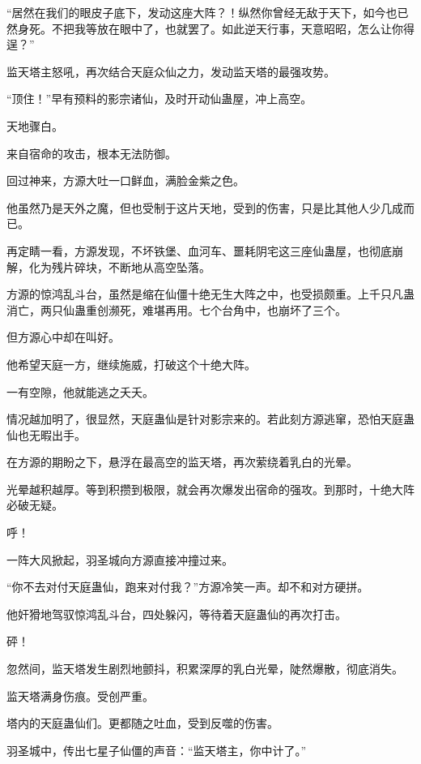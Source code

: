 
\begin{this_body}

“居然在我们的眼皮子底下，发动这座大阵？！纵然你曾经无敌于天下，如今也已然身死。不把我等放在眼中了，也就罢了。如此逆天行事，天意昭昭，怎么让你得逞？”

监天塔主怒吼，再次结合天庭众仙之力，发动监天塔的最强攻势。

“顶住！”早有预料的影宗诸仙，及时开动仙蛊屋，冲上高空。

天地骤白。

来自宿命的攻击，根本无法防御。

回过神来，方源大吐一口鲜血，满脸金紫之色。

他虽然乃是天外之魔，但也受制于这片天地，受到的伤害，只是比其他人少几成而已。

再定睛一看，方源发现，不坏铁堡、血河车、噩耗阴宅这三座仙蛊屋，也彻底崩解，化为残片碎块，不断地从高空坠落。

方源的惊鸿乱斗台，虽然是缩在仙僵十绝无生大阵之中，也受损颇重。上千只凡蛊消亡，两只仙蛊重创濒死，难堪再用。七个台角中，也崩坏了三个。

但方源心中却在叫好。

他希望天庭一方，继续施威，打破这个十绝大阵。

一有空隙，他就能逃之夭夭。

情况越加明了，很显然，天庭蛊仙是针对影宗来的。若此刻方源逃窜，恐怕天庭蛊仙也无暇出手。

在方源的期盼之下，悬浮在最高空的监天塔，再次萦绕着乳白的光晕。

光晕越积越厚。等到积攒到极限，就会再次爆发出宿命的强攻。到那时，十绝大阵必破无疑。

呼！

一阵大风掀起，羽圣城向方源直接冲撞过来。

“你不去对付天庭蛊仙，跑来对付我？”方源冷笑一声。却不和对方硬拼。

他奸猾地驾驭惊鸿乱斗台，四处躲闪，等待着天庭蛊仙的再次打击。

砰！

忽然间，监天塔发生剧烈地颤抖，积累深厚的乳白光晕，陡然爆散，彻底消失。

监天塔满身伤痕。受创严重。

塔内的天庭蛊仙们。更都随之吐血，受到反噬的伤害。

羽圣城中，传出七星子仙僵的声音：“监天塔主，你中计了。”


\end{this_body}
